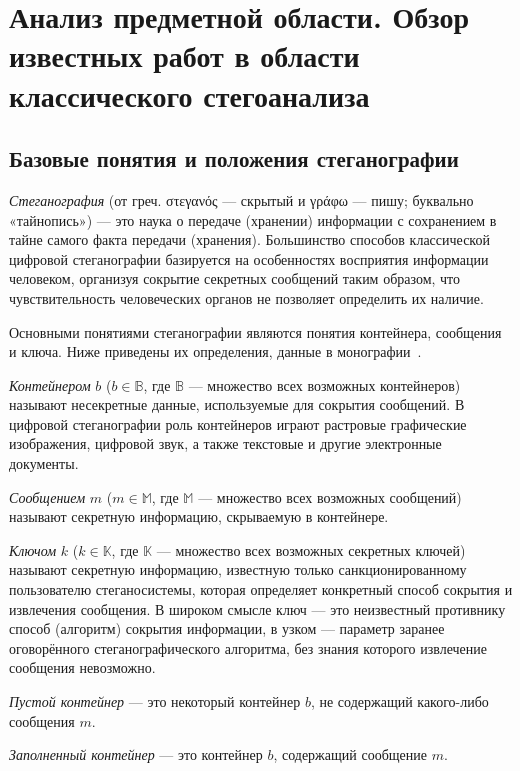 
\section{Анализ предметной области. Обзор известных работ в области классического стегоанализа}

\subsection{Базовые понятия и положения стеганографии}

\textit{Стеганография} (от греч. στεγανός — скрытый и γράφω — пишу; буквально «тайнопись») — это наука о передаче (хранении) информации с сохранением в тайне самого факта передачи (хранения). Большинство способов классической цифровой стеганографии базируется на особенностях восприятия информации человеком, организуя сокрытие секретных сообщений таким образом, что чувствительность человеческих органов не позволяет определить их наличие.

Основными понятиями стеганографии являются понятия контейнера, сообщения и ключа. Ниже приведены их определения, данные в монографии~\cite{Agranovskiy}.

\textit{Контейнером} $ b $ ($ b \in \mathbb{B} $, где $ \mathbb{B} $ — множество всех возможных контейнеров) называют несекретные данные, используемые для сокрытия сообщений. В цифровой стеганографии роль контейнеров играют растровые графические изображения, цифровой звук, а также текстовые и другие электронные документы.

\textit{Сообщением} $ m $ ($ m \in \mathbb{M} $, где $ \mathbb{M} $ — множество всех возможных сообщений) называют секретную информацию, скрываемую в контейнере.

\textit{Ключом} $ k $ ($ k \in \mathbb{K} $, где $ \mathbb{K} $ — множество всех возможных секретных ключей) называют секретную информацию, известную только санкционированному пользователю стеганосистемы, которая определяет конкретный способ сокрытия и извлечения сообщения. В широком смысле ключ — это неизвестный противнику способ (алгоритм) сокрытия информации, в узком — параметр заранее оговорённого стеганографического алгоритма, без знания которого извлечение сообщения невозможно.

\textit{Пустой контейнер} --- это некоторый контейнер $ b $, не содержащий какого-либо сообщения $ m $.

\textit{Заполненный контейнер} --- это контейнер $ b $, содержащий сообщение $ m $.


